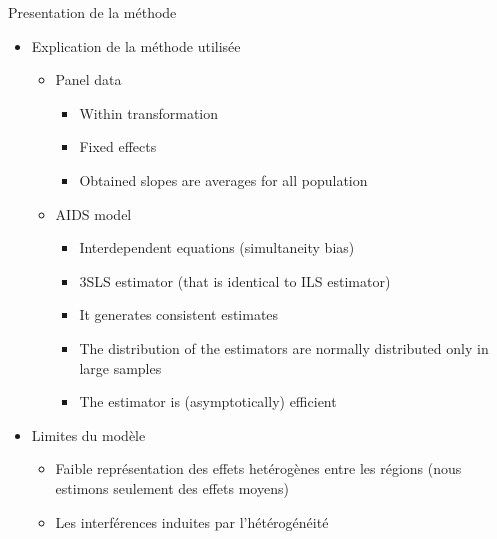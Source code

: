\documentclass[11pt,ignorenonframetext,]{beamer}
\providecommand{\tightlist}{%
  \setlength{\itemsep}{0pt}\setlength{\parskip}{0pt}}
\begin{document}
\begin{frame}{Presentation de la méthode}
\protect\hypertarget{presentation-de-la-methode}{}

\begin{itemize}
\tightlist
\item
  Explication de la méthode utilisée

  \begin{itemize}
  \tightlist
  \item
    Panel data

    \begin{itemize}
    \tightlist
    \item
      Within transformation
    \item
      Fixed effects
    \item
      Obtained slopes are averages for all population
    \end{itemize}
  \item
    AIDS model

    \begin{itemize}
    \tightlist
    \item
      Interdependent equations (simultaneity bias)
    \item
      3SLS estimator (that is identical to ILS estimator)
    \item
      It generates consistent estimates
    \item
      The distribution of the estimators are normally distributed only
      in large samples
    \item
      The estimator is (asymptotically) efficient
    \end{itemize}
  \end{itemize}
\item
  Limites du modèle

  \begin{itemize}
  \tightlist
  \item
    Faible représentation des effets hetérogènes entre les régions (nous
    estimons seulement des effets moyens)
  \item
    Les interférences induites par l'hétérogénéité
  \end{itemize}
\end{itemize}

\end{frame}
\end{document}
